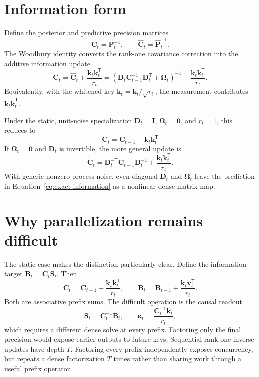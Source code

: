 \documentclass[11pt]{article}
\newcommand{\vct}[1]{\boldsymbol{#1}}
\newcommand{\tr}{\mathsf{T}}
\begin{document}
\section{Information form}

Define the posterior and predictive precision matrices
\begin{equation}
  \vct{C}_t=\vct{P}_t^{-1},
  \qquad
  \widehat{\vct{C}}_t=\widehat{\vct{P}}_t^{-1}.
\end{equation}
The Woodbury identity converts the rank-one covariance correction into the
additive information update
\begin{equation}
  \boxed{
  \vct{C}_t
  =\widehat{\vct{C}}_t+\frac{\vct{k}_t\vct{k}_t^{\tr}}{r_t}}
  =
  \left(
    \vct{D}_t\vct{C}_{t-1}^{-1}\vct{D}_t^{\tr}
    +\vct{\Omega}_t
  \right)^{-1}
  +\frac{\vct{k}_t\vct{k}_t^{\tr}}{r_t}.
  \label{eq:exact-information}
\end{equation}
Equivalently, with the whitened key
$\bar{\vct{k}}_t=\vct{k}_t/\sqrt{r_t}$, the measurement contributes
$\bar{\vct{k}}_t\bar{\vct{k}}_t^{\tr}$.

Under the static, unit-noise specialization
$\vct{D}_t=\vct{I}$, $\vct{\Omega}_t=\vct{0}$, and $r_t=1$, this reduces to
\begin{equation}
  \vct{C}_t=\vct{C}_{t-1}+\vct{k}_t\vct{k}_t^{\tr}
  \label{eq:static-information}
\end{equation}
If $\vct{\Omega}_t=\vct{0}$ and $\vct{D}_t$ is invertible, the more general
update is
\begin{equation}
  \vct{C}_t
  =\vct{D}_t^{-\tr}\vct{C}_{t-1}\vct{D}_t^{-1}
  +\frac{\vct{k}_t\vct{k}_t^{\tr}}{r_t}.
\end{equation}
With generic nonzero process noise, even diagonal $\vct{D}_t$ and
$\vct{\Omega}_t$ leave the prediction in Equation~\eqref{eq:exact-information}
as a nonlinear dense matrix map.

\section{Why parallelization remains difficult}

The static case makes the distinction particularly clear.  Define the
information target $\vct{B}_t=\vct{C}_t\vct{S}_t$.  Then
\begin{equation}
  \vct{C}_t
  =\vct{C}_{t-1}+\frac{\vct{k}_t\vct{k}_t^{\tr}}{r_t},
  \qquad
  \vct{B}_t
  =\vct{B}_{t-1}+\frac{\vct{k}_t\vct{v}_t^{\tr}}{r_t}.
\end{equation}
Both are associative prefix sums.  The difficult operation is the causal
readout
\begin{equation}
  \vct{S}_t=\vct{C}_t^{-1}\vct{B}_t,
  \qquad
  \vct{\kappa}_t=\frac{\vct{C}_t^{-1}\vct{k}_t}{r_t},
\end{equation}
which requires a different dense solve at every prefix.  Factoring only the
final precision would expose earlier outputs to future keys.  Sequential
rank-one inverse updates have depth $T$.  Factoring every prefix independently
exposes concurrency, but repeats a dense factorization $T$ times rather than
sharing work through a useful prefix operator.
\end{document}
